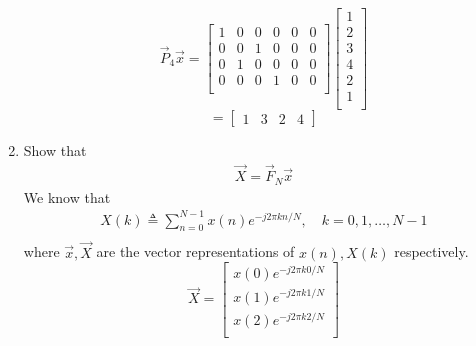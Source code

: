 \documentclass[journal,12pt,twocolumn]{IEEEtran}
\renewcommand\thesection{\arabic{section}}
\begin{document}
\begin{enumerate}[label=\arabic*.,ref=\thesection.\theenumi]
\begin{equation}
                \vec{P}_4 \vec{x} =
                \begin{bmatrix}
                     1 & 0 & 0 & 0 & 0 & 0 \\
                     0 & 0 & 1 & 0 & 0 & 0 \\
                     0 & 1 & 0 & 0 & 0 & 0 \\
                     0 & 0 & 0 & 1 & 0 & 0 \\
                \end{bmatrix}
                \begin{bmatrix}
                     1 \\
                     2 \\
                     3 \\
                     4 \\
                     2 \\
                     1 \\
                \end{bmatrix}
           \end{equation}
           \begin{equation}
                =
                \begin{bmatrix}
                     1 & 3 & 2 & 4
                \end{bmatrix}
           \end{equation}
     \item Show that
           \begin{align}
                \vec{X} = \vec{F}_N \vec{x}
                \label{eq:dft-mat-def}
           \end{align}
           \solution
           We know that \\
           \begin{align}
                X(k) \triangleq \sum_{n=0}^{N-1} x(n) e^{-j 2 \pi k n / N}, \quad k=0,1, \ldots, N-1 \\
           \end{align}
           where $\vec{x}, \vec{X}$ are the vector representations of $x(n), X(k)$ respectively.
           \begin{equation}
                \vec{X} =
                \begin{bmatrix}
                     x(0)e^{-j 2 \pi k 0 / N} \\
                     x(1)e^{-j 2 \pi k 1 / N} \\
                     x(2)e^{-j 2 \pi k 2 / N} \\

\end{bmatrix}
\end{equation}
\end{enumerate}
\end{document}
